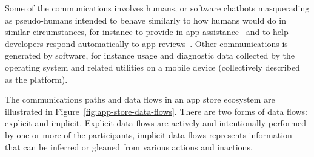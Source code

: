 Some of the communications involves humans, or software chatbots masquerading as pseudo-humans intended to behave similarly to how humans would do in similar circumstances, for instance to provide in-app assistance~\citep{baez2021_chatbot_integrations} and to help developers respond automatically to app reviews~\citep{greenheld2018_automating_developers_responses_to_app_reviews}. Other communications is generated by software, for instance usage and diagnostic data collected by the operating system and related utilities on a mobile device (collectively described as the platform).


The communications paths and data flows in an app store ecosystem are illustrated in Figure~\ref{fig:app-store-data-flows}. There are two forms of data flows: explicit and implicit. Explicit data flows are actively and intentionally performed by one or more of the participants, implicit data flows represents information that can be inferred or gleaned from various actions and inactions.

